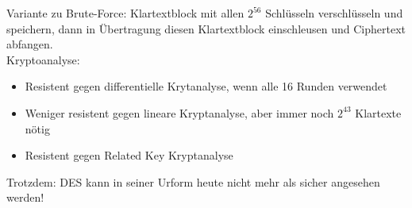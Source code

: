 Variante zu Brute-Force: Klartextblock mit allen $2^{56}$ Schlüsseln verschlüsseln und speichern, dann in Übertragung diesen
Klartextblock einschleusen und Ciphertext abfangen. \\

Kryptoanalyse: 

\begin{itemize}
    \item Resistent gegen differentielle Krytanalyse, wenn alle 16 Runden verwendet
    \item Weniger resistent gegen lineare Kryptanalyse, aber immer noch $2^{43}$ Klartexte nötig
    \item Resistent gegen Related Key Kryptanalyse
\end{itemize}

Trotzdem: DES kann in seiner Urform heute nicht mehr als sicher angesehen werden!